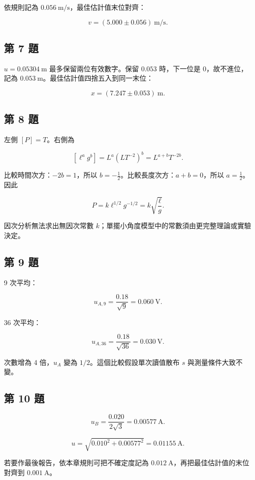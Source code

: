 \documentclass[11pt,a4paper]{article}
\begin{document}
依規則記為 \(0.056\ \mathrm{m/s}\)，最佳估計值末位對齊：

\[
\boxed{v=(5.000\pm0.056)\ \mathrm{m/s}}.
\]

\subsection{第 7 題}\label{ux7b2c-7-ux984c}

\(u=0.05304\ \mathrm{m}\) 最多保留兩位有效數字。保留 \(0.053\) 時，下一位是 0，故不進位，記為 \(0.053\ \mathrm{m}\)。最佳估計值四捨五入到同一末位：

\[
\boxed{x=(7.247\pm0.053)\ \mathrm{m}}.
\]

\subsection{第 8 題}\label{ux7b2c-8-ux984c}

左側 \([P]=T\)。右側為

\[
[\ell^a g^b]=L^a(LT^{-2})^b=L^{a+b}T^{-2b}.
\]

比較時間次方：\(-2b=1\)，所以 \(b=-\tfrac12\)。比較長度次方：\(a+b=0\)，所以 \(a=\tfrac12\)。因此

\[
P=k\ell^{1/2}g^{-1/2}=k\sqrt{\frac{\ell}{g}}.
\]

因次分析無法求出無因次常數 \(k\)；單擺小角度模型中的常數須由更完整理論或實驗決定。

\subsection{第 9 題}\label{ux7b2c-9-ux984c}

9 次平均：

\[
u_{A,9}=\frac{0.18}{\sqrt9}=0.060\ \mathrm{V}.
\]

36 次平均：

\[
u_{A,36}=\frac{0.18}{\sqrt{36}}=0.030\ \mathrm{V}.
\]

次數增為 4 倍，\(u_A\) 變為 \(1/2\)。這個比較假設單次讀值散布 \(s\) 與測量條件大致不變。

\subsection{第 10 題}\label{ux7b2c-10-ux984c}

\[
u_B=\frac{0.020}{2\sqrt3}=0.00577\ \mathrm{A}.
\]

\[
u=\sqrt{0.010^2+0.00577^2}=0.01155\ \mathrm{A}.
\]

若要作最後報告，依本章規則可把不確定度記為 \(0.012\ \mathrm{A}\)，再把最佳估計值的末位對齊到 \(0.001\ \mathrm{A}\)。
\end{document}
